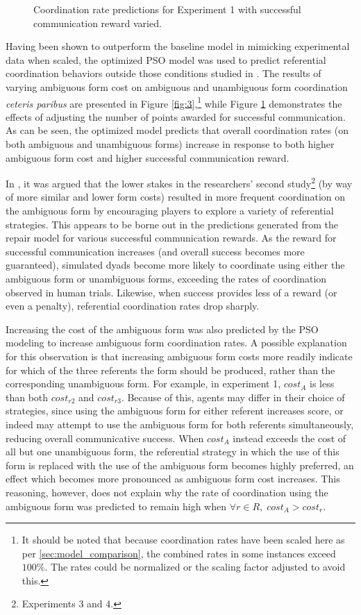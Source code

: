 \documentclass[a4paper,11pt]{article}
\begin{document}
\begin{figure}[t]
\centering
\scalebox{.475}{}
\caption{Coordination rate predictions for Experiment 1 with successful communication reward varied.}
\label{fig:4}
\end{figure}

Having been shown to outperform the baseline model in mimicking experimental data when scaled, the optimized PSO model was used to predict referential coordination behaviors outside those conditions studied in \cite{rohde2012}. The results of varying ambiguous form cost on ambiguous and unambiguous form coordination \textit{ceteris paribus} are presented in Figure \ref{fig:3},\footnote{It should be noted that because coordination rates have been scaled here as per \ref{sec:model_comparison}, the combined rates in some instances exceed $100\%$. The rates could be normalized or the scaling factor adjusted to avoid this.} while Figure \ref{fig:4} demonstrates the effects of adjusting the number of points awarded for successful communication. As can be seen, the optimized model predicts that overall coordination rates (on both ambiguous and unambiguous forms) increase in response to both higher ambiguous form cost and higher successful communication reward.

In \citeauthor{rohde2012}, it was argued that the lower stakes in the researchers' second study\footnote{Experiments 3 and 4.} (by way of more similar and lower form costs) resulted in more frequent coordination on the ambiguous form by encouraging players to explore a variety of referential strategies. This appears to be borne out in the predictions generated from the repair model for various successful communication rewards. As the reward for successful communication increases (and overall success becomes more guaranteed), simulated dyads become more likely to coordinate using either the ambiguous form or unambiguous forms, exceeding the rates of coordination observed in human trials. Likewise, when success provides less of a reward (or even a penalty), referential coordination rates drop sharply. 

Increasing the cost of the ambiguous form was also predicted by the PSO modeling to increase ambiguous form coordination rates. A possible explanation for this observation is that increasing ambiguous form costs more readily indicate for which of the three referents the form should be produced, rather than the corresponding unambiguous form. For example, in experiment 1, $cost_A$ is less than both $cost_{r2}$ and $cost_{r3}$. Because of this, agents may differ in their choice of strategies, since using the ambiguous form for either referent increases score, or indeed may attempt to use the ambiguous form for both referents simultaneously, reducing overall communicative success. When $cost_A$ instead exceeds the cost of all but one unambiguous form, the referential strategy in which the use of this form is replaced with the use of the ambiguous form becomes highly preferred, an effect which becomes more pronounced as ambiguous form cost increases. This reasoning, however, does not explain why the rate of coordination using the ambiguous form was predicted to remain high when $\forall r \in R,\; cost_A > cost_r$.
\end{document}
